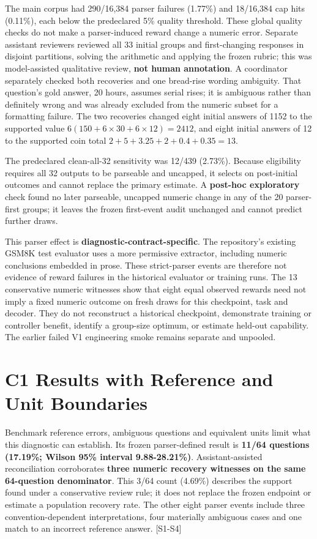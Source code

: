 \documentclass[12pt,a4paper]{report}
\begin{document}
The main corpus had 290/16,384 parser failures (1.77\%) and 18/16,384
cap hits (0.11\%), each below the predeclared 5\% quality threshold.
These global quality checks do not make a parser-induced reward change a
numeric error. Separate assistant reviewers reviewed all 33 initial
groups and first-changing responses in disjoint partitions, solving the
arithmetic and applying the frozen rubric; this was model-assisted
qualitative review, \textbf{not human annotation}. A coordinator
separately checked both recoveries and one bread-rise wording ambiguity.
That question's gold answer, 20 hours, assumes serial rises; it is
ambiguous rather than definitely wrong and was already excluded from the
numeric subset for a formatting failure. The two recoveries changed
eight initial answers of 1152 to the supported value
\(6(150+6\times30+6\times12)=2412\), and eight initial answers of 12 to
the supported coin total \(2+5+3.25+2+0.4+0.35=13\).

The predeclared clean-all-32 sensitivity was 12/439 (2.73\%). Because
eligibility requires all 32 outputs to be parseable and uncapped, it
selects on post-initial outcomes and cannot replace the primary
estimate. A \textbf{post-hoc exploratory} check found no later
parseable, uncapped numeric change in any of the 20 parser-first groups;
it leaves the frozen first-event audit unchanged and cannot predict
further draws.

This parser effect is \textbf{diagnostic-contract-specific}. The
repository's existing GSM8K test evaluator uses a more permissive
extractor, including numeric conclusions embedded in prose. These
strict-parser events are therefore not evidence of reward failures in
the historical evaluator or training runs. The 13 conservative numeric
witnesses show that eight equal observed rewards need not imply a fixed
numeric outcome on fresh draws for this checkpoint, task and decoder.
They do not reconstruct a historical checkpoint, demonstrate training or
controller benefit, identify a group-size optimum, or estimate held-out
capability. The earlier failed V1 engineering smoke remains separate and
unpooled.

\section{C1 Results with Reference and Unit
Boundaries}\label{c1-results-with-reference-and-unit-boundaries}

Benchmark reference errors, ambiguous questions and equivalent units
limit what this diagnostic can establish. Its frozen parser-defined
result is \textbf{11/64 questions (17.19\%; Wilson 95\% interval
9.88-28.21\%)}. Assistant-assisted reconciliation corroborates
\textbf{three numeric recovery witnesses on the same 64-question
denominator}. This 3/64 count (4.69\%) describes the support found under
a conservative review rule; it does not replace the frozen endpoint or
estimate a population recovery rate. The other eight parser events
include three convention-dependent interpretations, four materially
ambiguous cases and one match to an incorrect reference answer.
{[}S1-S4{]}
\end{document}
